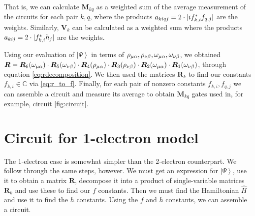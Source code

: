 \documentclass{aux/ttuthes2007}
\newcommand{\ket}[1]{\ensuremath{\left|#1\right\rangle}}
\newcommand{\ind}[1]{{\uo #1 \oo #1}}
\newcommand{\uo}[1]{
		\IfEqCase{#1}{
			{0}{\mu}
			{1}{\nu}
			{2}{\xi}
		}[\PackageError{uo}{Undefined option to uo: #1}{}]
}
\newcommand{\oo}[1]{
		\IfEqCase{#1}{
			{0}{\alpha}
			{1}{\beta}
			{2}{\gamma}
		}[\PackageError{unocorb}{Undefined option to unuo: #1}{}]
}
\DeclarePairedDelimiter\abs{\lvert}{\rvert}
\begin{document}
%
That is, we can calculate $\bm M_{kq}$ as a weighted sum of the average measurement of the circuits for each pair $k, q$, where the products $a_{kiqj} = 2\cdot \abs{if_{k, i}^*f_{q, j}}$ are the weights.
Similarly, $\bm V_k$ can be calculated as a weighted sum where the products $a_{kij} = 2\cdot \abs{f_{k, i}^*h_j}$ are the weights.

Using our evaluation of $\ket\Psi$ in terms of $\rho_\ind 0, \rho_\ind 1, \omega_\ind 0, \omega_\ind 1$, we obtained 
$\bm R = 
\bm R_6(\omega_\ind 0) \cdot
\bm R_5(\omega_\ind 1) \cdot
\bm R_4(\rho_\ind 0) \cdot
\bm R_3(\rho_\ind 1) \cdot
\bm R_2(\omega_\ind 0) \cdot
\bm R_1(\omega_\ind 1)
$, through equation \ref{eq:rdecomposition}.
%
We then used the matrices $\bm R_k$ to find our constants $f_{k, i} \in \mathbb{C}$ via \ref{eq:r_to_f}. Finally, for each pair of nonzero constants $f_{k, i}, f_{q, j}$ we can assemble a circuit and measure its average to obtain $\bm M_{kq}$ gates used in, for example, circuit \ref{fig:circuit}.


\section {\textbf{Circuit for 1-electron model}}

The 1-electron case is somewhat simpler than the 2-electron counterpart. We follow through the same steps, however. We must get an expression for $\ket \Psi$, use it to obtain a matrix $\bm R$, decompose it into a product of single-variable matrices $\bm R_k$ and use these to find our $f$ constants. Then we must find the Hamiltonian $\hat H$ and use it to find the $h$ constants. Using the $f$ and $h$ constants, we can assemble a circuit.
%
\end{document}
